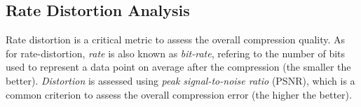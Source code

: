 \subsection{Rate Distortion Analysis}

Rate distortion is a critical metric to assess the overall compression quality. As for rate-distortion, \emph{rate} is also known as \emph{bit-rate}, refering to the number of bits used to represent a data point on average after the compression (the smaller the better). \emph{Distortion} is assessed using \emph{peak signal-to-noise ratio} (PSNR), which is a common criterion to assess the overall compression error (the higher the better).

